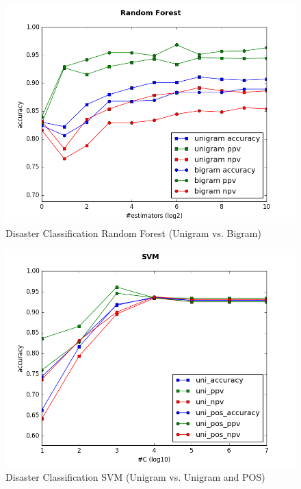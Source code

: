 \documentclass[letterpaper,twocolumn,10pt]{article}
\begin{document}
\begin{figure}[H]
	\centering
	\includegraphics[width=\columnwidth]{../graphs/DisasterClassification/random_forest_unigram_vs_bigram_features.png}
	\caption{Disaster Classification Random Forest (Unigram vs. Bigram)}
	\label{fig:disaster_classification_rf}
\end{figure}

\begin{figure}[H]
	\centering
	\includegraphics[width=\columnwidth]{../graphs/DisasterClassification/svm_uni_features.png}
	\caption{Disaster Classification SVM (Unigram vs. Unigram and POS)}
	\label{fig:disaster_classification_svm_uni}
\end{figure}
\end{document}
